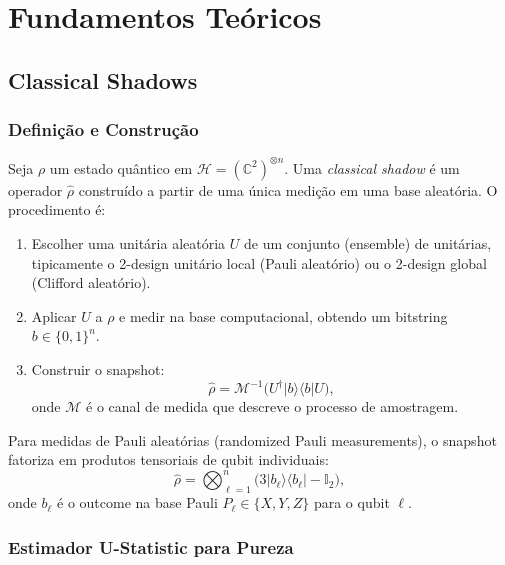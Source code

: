 \documentclass[12pt,a4paper,oneside]{book}
\theoremstyle{definition}
\theoremstyle{remark}
\begin{document}
\chapter{Fundamentos Teóricos}\label{chap:fundamentos}

\section{Classical Shadows}

\subsection{Definição e Construção}

Seja $\rho$ um estado quântico em $\mathcal{H} = (\mathbb{C}^2)^{\otimes n}$. Uma \textit{classical shadow} é um operador $\hat{\rho}$ construído a partir de uma única medição em uma base aleatória. O procedimento é:

\begin{enumerate}
    \item Escolher uma unitária aleatória $U$ de um conjunto (ensemble) de unitárias, tipicamente o 2-design unitário local (Pauli aleatório) ou o 2-design global (Clifford aleatório).
    \item Aplicar $U$ a $\rho$ e medir na base computacional, obtendo um bitstring $b \in \{0,1\}^n$.
    \item Construir o snapshot:
    \begin{equation}\label{eq:snapshot}
        \hat{\rho} = \mathcal{M}^{-1}\bigl(U^\dagger |b\rangle\langle b| U\bigr),
    \end{equation}
    onde $\mathcal{M}$ é o canal de medida que descreve o processo de amostragem.
\end{enumerate}

Para medidas de Pauli aleatórias (randomized Pauli measurements), o snapshot fatoriza em produtos tensoriais de qubit individuais:
\begin{equation}\label{eq:snapshot_pauli}
    \hat{\rho} = \bigotimes_{\ell=1}^{n} \bigl(3|b_\ell\rangle\langle b_\ell| - \mathbb{I}_2\bigr),
\end{equation}
onde $b_\ell$ é o outcome na base Pauli $P_\ell \in \{X, Y, Z\}$ para o qubit $\ell$.

\subsection{Estimador U-Statistic para Pureza}
\end{document}
